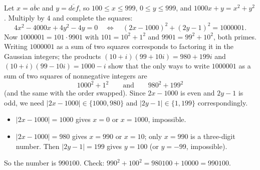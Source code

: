Let $x=\overline{abc}$ and $y=\overline{def}$, so $100\le x\le999$, $0\le y\le999$, and $1000x+y=x^2+y^2$. Multiply by $4$ and complete the squares:
\[
4x^2-4000x+4y^2-4y=0\quad\Longleftrightarrow\quad (2x-1000)^2+(2y-1)^2=1000001 .
\]
Now $1000001=101\cdot9901$ with $101=10^2+1^2$ and $9901=99^2+10^2$, both primes. Writing $1000001$ as a sum of two squares corresponds to factoring it in the Gaussian integers; the products $(10+i)(99+10i)=980+199i$ and $(10+i)(99-10i)=1000-i$ show that the only ways to write $1000001$ as a sum of two squares of nonnegative integers are
\[
1000^2+1^2\qquad\text{and}\qquad 980^2+199^2
\]
(and the same with the order swapped). Since $2x-1000$ is even and $2y-1$ is odd, we need $|2x-1000|\in\{1000,980\}$ and $|2y-1|\in\{1,199\}$ correspondingly.
\begin{itemize}
\item $|2x-1000|=1000$ gives $x=0$ or $x=1000$, impossible.
\item $|2x-1000|=980$ gives $x=990$ or $x=10$; only $x=990$ is a three-digit number. Then $|2y-1|=199$ gives $y=100$ (or $y=-99$, impossible).
\end{itemize}
So the number is $\boxed{990100}$. Check: $990^2+100^2=980100+10000=990100$.
